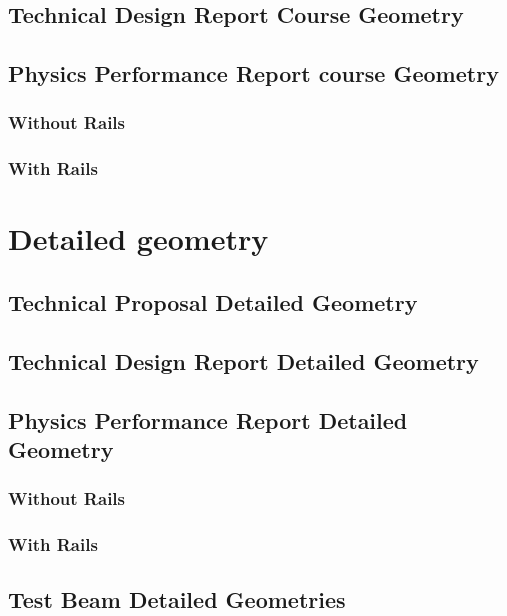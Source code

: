 \subsection{Technical Design Report Course Geometry}

\subsection{Physics Performance Report course Geometry}

\subsubsection{Without Rails}

\subsubsection{With Rails}

\section{Detailed geometry}\label{ITSMan:ch2:Detaile_geometry_section}

\subsection{Technical Proposal Detailed Geometry}

\subsection{Technical Design Report Detailed Geometry}

\subsection{Physics Performance Report Detailed Geometry}

\subsubsection{Without Rails}

\subsubsection{With Rails}

\subsection{Test Beam Detailed Geometries}

